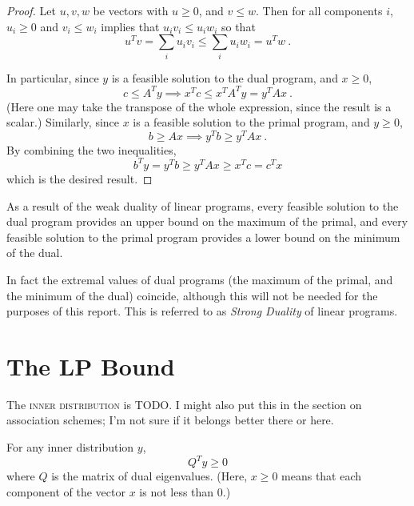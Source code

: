 \documentclass{report}
\begin{document}
      \begin{proof}
        Let $u, v, w$ be vectors with $u \geq 0$, and $v \leq w$.
        Then for all components $i$,
        $u_i \geq 0$ and $v_i \leq w_i$ implies that $u_i v_i \leq u_i w_i$
        so that
        $$
          u^T v = \sum_i u_i v_i
          \leq \sum_i u_i w_i = u^T w
          \ .
        $$

        In particular, since $y$ is a feasible solution to the dual program,
        and $x \geq 0$,
        $$
          c \leq A^T y 
          \implies x^T c \leq x^T A^T y = y^T A x
          \ .
        $$
        (Here one may take the transpose of the whole expression,
        since the result is a scalar.)
        Similarly, since $x$ is a feasible solution to the primal program,
        and $y \geq 0$,
        $$
          b \geq A x 
          \implies y^T b \geq y^T A x
          \ .
        $$
        By combining the two inequalities,
        $$
          b^T y = y^T b \geq y^T A x \geq x^T c = c^T x
        $$
        which is the desired result.
      \end{proof}

      As a result of the weak duality of linear programs,
      every feasible solution to the dual program
      provides an upper bound on the maximum of the primal,
      and every feasible solution to the primal program
      provides a lower bound on the minimum of the dual.

      In fact the extremal values of dual programs
      (the maximum of the primal, and the minimum of the dual)
      coincide, although this will not be needed for the purposes of this
      report.
      This is referred to as \textit{Strong Duality} of linear programs.

  \section{The LP Bound}

    \begin{defn}
      The \textsc{inner distribution} is TODO.
      I might also put this in the section on association schemes;
      I'm not sure if it belongs better there or here.
    \end{defn}

    \begin{thm}\label{lp-ineq}
      For any inner distribution $y$,
      $$
        Q^T y \geq 0
      $$
      where $Q$ is the matrix of dual eigenvalues.
      (Here, $x \geq 0$ means that each component of
      the vector $x$ is not less than $0$.)
    \end{thm}
\end{document}
